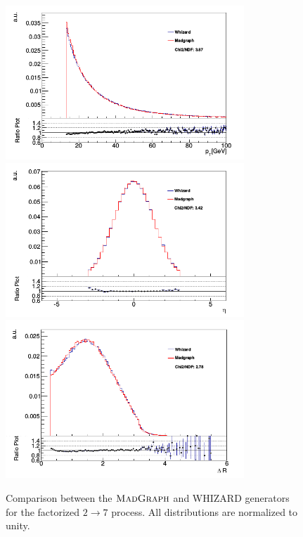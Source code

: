 \begin{figure} 
\begin{center}
\includegraphics[width=0.8\textwidth]{Figures/WHIZARDvsMADGRAPHPT.png} \\
\includegraphics[width=0.8\textwidth]{Figures/WHIZARDvsMADGRAPHEta.png} \\
\includegraphics[width=0.8\textwidth]{Figures/WHIZARDvsMADGRAPHDR.png} \\
\end{center}
\caption{Comparison between the $\textsc{MadGraph}$ and WHIZARD generators for the factorized $2 \to 7$ process. All distributions are normalized to unity. \cite{ttgammasimulation}}
\label{fig-WHIZARDvsMADGRAPH}
\end{figure}  

